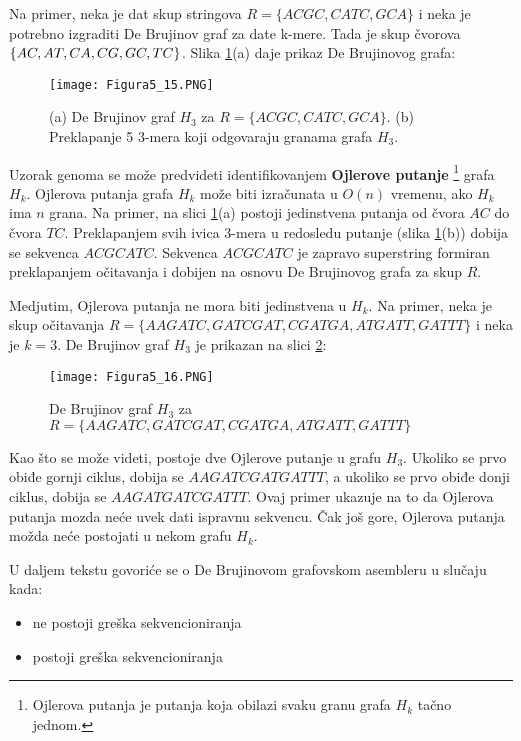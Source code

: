 \documentclass[12pt,oneside]{memoir}
\begin{document}
Na primer, neka je dat skup stringova $R = \{ACGC, CATC, GCA\}$ i neka je potrebno izgraditi De Brujinov graf za date k-mere. Tada je skup čvorova $\{AC, AT, \\ CA, CG, GC, TC\}$. Slika \ref{fig:9}(a) daje prikaz De Brujinovog grafa:

\begin{figure}[!ht]
\centering
\texttt{[image: Figura5\_15.PNG]}
\caption{(a) De Brujinov graf $H_3$ za $R = \{ACGC, CATC, GCA\}$. (b)
 Preklapanje 5 3-mera koji odgovaraju granama grafa $H_3$.}
 \label{fig:9}
 \end{figure}

Uzorak genoma se može predvideti identifikovanjem \textbf{Ojlerove putanje} \footnote{Ojlerova putanja je putanja koja obilazi svaku granu grafa $H_k$ tačno jednom.} grafa $H_k$. Ojlerova putanja grafa $H_k$ može biti izračunata u $O(n)$ vremenu, ako $H_k$ ima $n$ grana. Na primer, na slici \ref{fig:9}(a) postoji jedinstvena putanja od čvora $AC$ do čvora $TC$. Preklapanjem svih ivica 3-mera u redosledu putanje (slika \ref{fig:9}(b)) dobija se sekvenca $ACGCATC$. Sekvenca $ACGCATC$ je zapravo superstring formiran preklapanjem očitavanja i dobijen na osnovu De Brujinovog grafa za skup $R$.

Medjutim, Ojlerova putanja ne mora biti jedinstvena u $H_k$. Na primer, neka je skup očitavanja $R = \{AAGATC, GATCGAT, CGATGA, ATGATT, GATTT\}$ i neka je $k = 3$. De Brujinov graf $H_3$ je prikazan na slici  \ref{fig:10}: 

\begin{figure}[!ht]
\centering
\texttt{[image: Figura5\_16.PNG]}
\caption{De Brujinov graf $H_3$ za $R = \{AAGATC, GATCGAT, CGATGA, ATGATT, GATTT\}$ }
\label{fig:10}
\end{figure}

Kao što se može videti, postoje dve Ojlerove putanje u grafu $H_3$. Ukoliko se prvo obiđe gornji ciklus, dobija se $AAGATCGATGATTT$, a ukoliko se prvo obiđe donji ciklus, dobija se $AAGATGATCGATTT$. Ovaj primer ukazuje na to da Ojlerova putanja mozda neće uvek dati ispravnu sekvencu. Čak još gore, Ojlerova putanja možda neće postojati u nekom grafu $H_k$.

U daljem tekstu govoriće se o De Brujinovom grafovskom asembleru u slučaju kada:
\begin{itemize}
    \item{ne postoji greška sekvencioniranja}
    \item{postoji greška sekvencioniranja}
\end{itemize}
\end{document}
